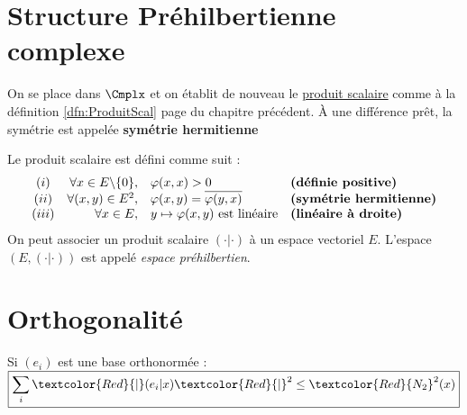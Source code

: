 \documentclass[11pt,a4paper,fleqn,pdftex]{report}
\begin{document}
\section{Structure Préhilbertienne complexe}
On se place dans $\Cmplx$ et on établit de nouveau le \uline{produit scalaire} comme à la définition \ref{dfn:ProduitScal} page \pageref{dfn:ProduitScal} du chapitre précédent. À une différence prêt, la symétrie est appelée \textbf{symétrie hermitienne}
\begin{dfn}\label{dfn:ProduitScalCmplx}
Le produit scalaire  est défini comme suit : 
\[
\begin{array}{c r l l}
(i)&\forall x \in E\backslash \{ 0 \} , &{\varphi(x,x)>0}&\text{\textbf{(définie positive)}}\\
(ii)&\forall (x,y) \in E^2, &{\varphi (x,y) = \overline {\varphi (y,x)}} &\text{\textbf{(symétrie hermitienne)}}\\
(iii)&\forall x \in E, &{y \mapsto \varphi(x,y) \text{ est linéaire}}&\text{\textbf{(linéaire à droite)}}
\end{array}
\]
On peut associer un produit scalaire $(\cdot | \cdot )$ à un espace vectoriel $E$. L'espace $\left( E, (\cdot | \cdot ) \right)
$ est appelé \emph{espace préhilbertien}.
\end{dfn}
\section{Orthogonalité}
\begin{theorem}
Si $(e_i)$ est une base orthonormée : 
$\boxed{\sum_i \textcolor{Red}{|}(e_i|x)\textcolor{Red}{|}^2 \le \textcolor{Red}{N_2}^2 (x)}$
\end{theorem}
\end{document}
